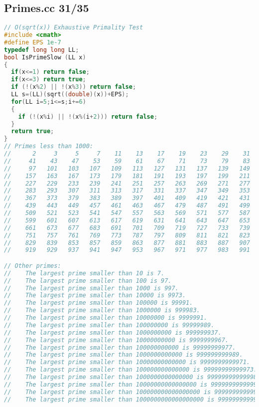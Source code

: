 \subsection{Primes.cc 31/35}
\begin{lstlisting}[language=C++]
// O(sqrt(x)) Exhaustive Primality Test
#include <cmath>
#define EPS 1e-7
typedef long long LL;
bool IsPrimeSlow (LL x)
{
  if(x<=1) return false;
  if(x<=3) return true;
  if (!(x%2) || !(x%3)) return false;
  LL s=(LL)(sqrt((double)(x))+EPS);
  for(LL i=5;i<=s;i+=6)
  {
    if (!(x%i) || !(x%(i+2))) return false;
  }
  return true;
}
// Primes less than 1000:
//      2     3     5     7    11    13    17    19    23    29    31    37
//     41    43    47    53    59    61    67    71    73    79    83    89
//     97   101   103   107   109   113   127   131   137   139   149   151
//    157   163   167   173   179   181   191   193   197   199   211   223
//    227   229   233   239   241   251   257   263   269   271   277   281
//    283   293   307   311   313   317   331   337   347   349   353   359
//    367   373   379   383   389   397   401   409   419   421   431   433
//    439   443   449   457   461   463   467   479   487   491   499   503
//    509   521   523   541   547   557   563   569   571   577   587   593
//    599   601   607   613   617   619   631   641   643   647   653   659
//    661   673   677   683   691   701   709   719   727   733   739   743
//    751   757   761   769   773   787   797   809   811   821   823   827
//    829   839   853   857   859   863   877   881   883   887   907   911
//    919   929   937   941   947   953   967   971   977   983   991   997

// Other primes:
//    The largest prime smaller than 10 is 7.
//    The largest prime smaller than 100 is 97.
//    The largest prime smaller than 1000 is 997.
//    The largest prime smaller than 10000 is 9973.
//    The largest prime smaller than 100000 is 99991.
//    The largest prime smaller than 1000000 is 999983.
//    The largest prime smaller than 10000000 is 9999991.
//    The largest prime smaller than 100000000 is 99999989.
//    The largest prime smaller than 1000000000 is 999999937.
//    The largest prime smaller than 10000000000 is 9999999967.
//    The largest prime smaller than 100000000000 is 99999999977.
//    The largest prime smaller than 1000000000000 is 999999999989.
//    The largest prime smaller than 10000000000000 is 9999999999971.
//    The largest prime smaller than 100000000000000 is 99999999999973.
//    The largest prime smaller than 1000000000000000 is 999999999999989.
//    The largest prime smaller than 10000000000000000 is 9999999999999937.
//    The largest prime smaller than 100000000000000000 is 99999999999999997.
//    The largest prime smaller than 1000000000000000000 is 999999999999999989.

\end{lstlisting}
